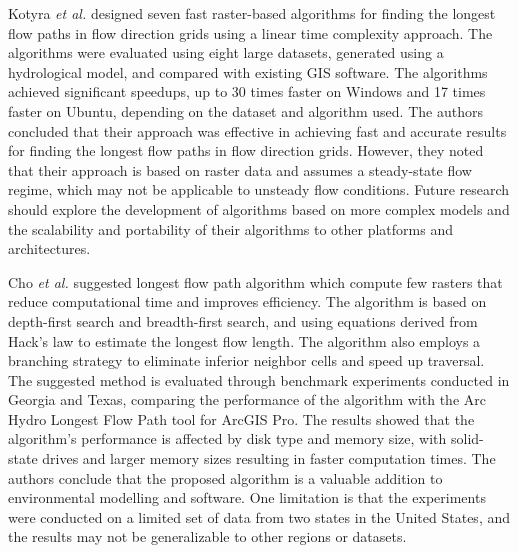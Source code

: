 \documentclass[journal, a4paper]{IEEEtran}
\begin{document}
	Kotyra \textit{et al.} \cite{KOTYRA2023105728} designed seven fast raster-based algorithms for finding the longest flow paths in flow direction grids using a linear time complexity approach. The algorithms were evaluated using eight large datasets, generated using a hydrological model, and compared with existing GIS software. The algorithms achieved significant speedups, up to 30 times faster on Windows and 17 times faster on Ubuntu, depending on the dataset and algorithm used. The authors concluded that their approach was effective in achieving fast and accurate results for finding the longest flow paths in flow direction grids. However, they noted that their approach is based on raster data and assumes a steady-state flow regime, which may not be applicable to unsteady flow conditions. Future research should explore the development of algorithms based on more complex models and the scalability and portability of their algorithms to other platforms and architectures.
	
	Cho \textit{et al.} \cite{CHO2020104774} suggested longest flow path algorithm which compute few rasters that reduce computational time and improves efficiency. The algorithm is based on depth-first search and breadth-first search, and using equations derived from Hack's law to estimate the longest flow length. The algorithm also employs a branching strategy to eliminate inferior neighbor cells and speed up traversal. The suggested method is evaluated through benchmark experiments conducted in Georgia and Texas, comparing the performance of the algorithm with the Arc Hydro Longest Flow Path tool for ArcGIS Pro. The results showed that the algorithm's performance is affected by disk type and memory size, with solid-state drives and larger memory sizes resulting in faster computation times. The authors conclude that the proposed algorithm is a valuable addition to environmental modelling and software. One limitation is that the experiments were conducted on a limited set of data from two states in the United States, and the results may not be generalizable to other regions or datasets. 



	
	
\end{document}
